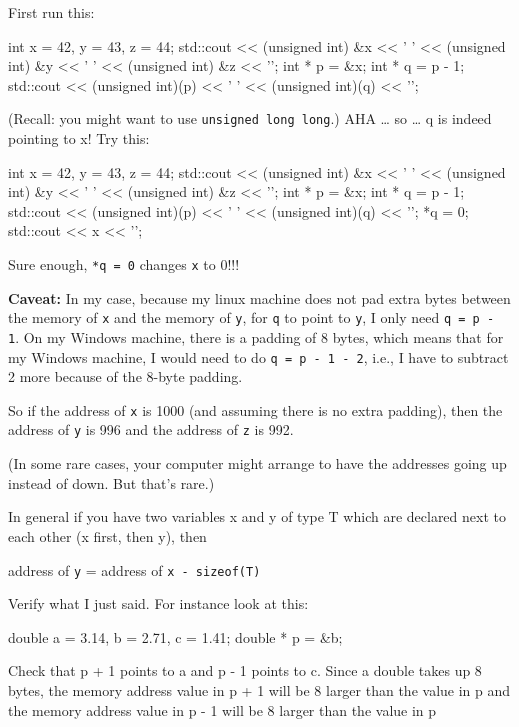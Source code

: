 First run this:

\begin{consolethree}[escapeinside=||]
int x = 42, y = 43, z = 44;
std::cout << (unsigned int) &x << ' '
          << (unsigned int) &y << ' '
          << (unsigned int) &z << '\n';
int * p = &x;
int * q = p - 1;
std::cout << (unsigned int)(p) << ' '
          << (unsigned int)(q) << '\n';
\end{consolethree}

(Recall: you might want to use \texttt{unsigned long long}.) AHA \ldots{}
so \ldots{} q is indeed pointing to x! Try this:

\begin{consolethree}[escapeinside=||]
int x = 42, y = 43, z = 44;
std::cout << (unsigned int) &x << ' '
          << (unsigned int) &y << ' '
          << (unsigned int) &z << '\n';
int * p = &x;
int * q = p - 1;
std::cout << (unsigned int)(p) << ' '
          << (unsigned int)(q) << '\n';
*q = 0;
std::cout << x << '\n';
\end{consolethree}

Sure enough, \texttt{*q = 0} changes \texttt{x} to 0!!!

\textbf{Caveat:} In my case, because my linux machine does not pad extra
bytes between the memory of \texttt{x} and the memory of \texttt{y}, for
\texttt{q} to point to \texttt{y}, I only need \texttt{q = p - 1}. On my
Windows machine, there is a padding of 8 bytes, which means that for my
Windows machine, I would need to do \texttt{q = p - 1 - 2}, i.e., I have
to subtract 2 more because of the 8-byte padding.

So if the address of \texttt{x} is 1000 (and assuming there is no extra
padding), then the address of \texttt{y} is 996 and the address of
\texttt{z} is 992.

(In some rare cases, your computer might arrange to have the addresses
going up instead of down. But that's rare.)

In general if you have two variables x and y of type T which are
declared next to each other (x first, then y), then

address of \texttt{y} = address of \texttt{x - sizeof(T)}

\begin{ex}
Verify what I just said. For instance look at this:

\begin{consolethree}[escapeinside=||]
double a = 3.14, b = 2.71, c = 1.41;
double * p = &b;
\end{consolethree}

Check that p + 1 points to a and p - 1 points to c. Since a double
takes up 8 bytes, the memory address value in p + 1 will be 8 larger
than the value in p and the memory address value in p - 1 will be 8
larger than the value in p
\end{ex}

